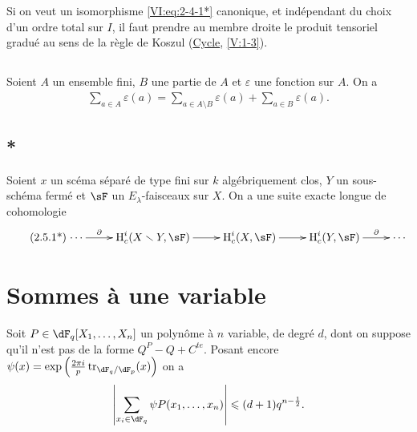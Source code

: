 Si on veut un isomorphisme \eqref{VI:eq:2-4-1*} canonique, et ind\'ependant du 
choix d'un ordre total sur $I$, il faut prendre au membre droite le produit 
tensoriel gradu\'e au sens de la r\`egle de Koszul 
(\hyperref[IV]{Cycle}, \ref{V:1-3}). 





\subsection{}\label{VI:2-5}

Soient $A$ un ensemble fini, $B$ une partie de $A$ et $\varepsilon$ une 
fonction sur $A$. On a 
\begin{align*}\tag{2.5.1}\label{VI:2-5-1}
  \sum_{a\in A} \varepsilon(a) = \sum_{a\in A\setminus B}\varepsilon(a) + \sum_{a\in B} \varepsilon(a) \text{.}
\end{align*}





\addtocounter{subsection}{-1}
\subsection{*}\label{VI:2-5*}

Soient $x$ un sc\'ema s\'epar\'e de type fini sur $k$ alg\'ebriquement clos, 
$Y$ un sous-sch\'ema ferm\'e et $\sF$ un $E_\lambda$-faisceaux sur $X$. On a 
une suite exacte longue de cohomologie 
\begin{align*}\tag{2.5.1*}\label{VI:eq:2-5-1*}
\xymatrix{
  \cdots \ar[r]^-\partial 
    & \h_c^i(X\setminus Y,\sF) \ar[r] 
    & \h_c^i(X,\sF) \ar[r] 
    & \h_c^i(Y,\sF) \ar[r]^-\partial 
    & \cdots 
}
\end{align*}










\section{Sommes \`a une variable}\label{VI:3}

\begin{proposition_}\label{VI:3-8}
Soit $P\in \dF_q[X_1,\dots,X_n]$ un polyn\^ome \`a $n$ variable, de degr\'e 
$d$, dont on suppose qu'il n'est pas de la forme $Q^P-Q+C^{te}$. Posant encore 
$\psi(x) = \exp\left(\frac{2\pi i}{p} \tr_{\dF_q/\dF_p}(x)\right)$ on a 
\[
  \left|\sum_{x_i\in \dF_q} \psi P(x_1,\dots,x_n)\right| \leqslant (d+1) q^{n-\frac 1 2} \text{.}
\]
\end{proposition_}










